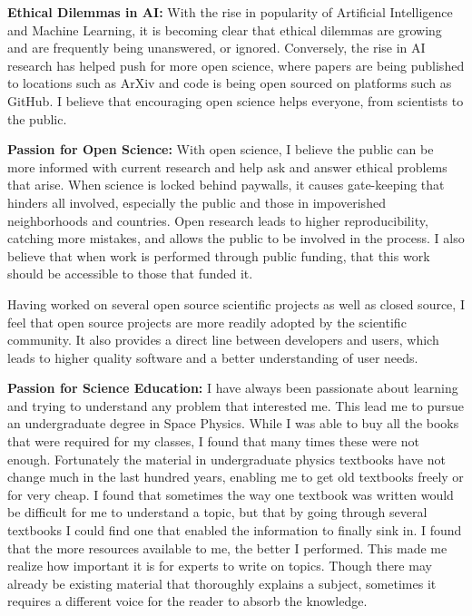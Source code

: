 \documentclass[12pt]{article}
\begin{document}
\textbf{Ethical Dilemmas in AI: }With the rise in popularity of Artificial
Intelligence and Machine Learning, it is becoming clear that ethical dilemmas
are growing and are frequently being unanswered, or ignored. Conversely, the
rise in AI research has helped push for more open science, where papers are
being published to locations such as ArXiv and code is being open sourced on
platforms such as GitHub. I believe that encouraging open science helps
everyone, from scientists to the public. 


\textbf{Passion for Open Science: }With open science, I believe the public can
be more informed with current research and help ask and answer ethical problems
that arise. When science is locked behind paywalls, it causes gate-keeping that
hinders all involved, especially the public and those in impoverished
neighborhoods and countries. Open research leads to higher reproducibility,
catching more mistakes, and allows the public to be involved in the process. I
also believe that when work is performed through public funding, that this work
should be accessible to those that funded it.

Having worked on several open source scientific projects as well as closed
source, I feel that open source projects are more readily adopted
by the scientific community. It also provides a direct line between developers and
users, which leads to higher quality software and a better understanding of
user needs. 

\textbf{Passion for Science Education: }I have always been passionate about
learning and trying to understand any problem that interested me. This lead me
to pursue an undergraduate degree in Space Physics. While I was able to buy all
the books that were required for my classes, I found that many times these were
not enough. Fortunately the material in undergraduate physics textbooks have not
change much in the last hundred years, enabling me to get old textbooks freely
or for very cheap. I found that sometimes the way one textbook was written would
be difficult for me to understand a topic, but that by going through several
textbooks I could find one that enabled the information to finally sink in. I
found that the more resources available to me, the better I performed. This made
me realize how important it is for experts to write on topics. Though there may
already be existing material that thoroughly explains a subject, sometimes it
requires a different voice for the reader to absorb the knowledge.
\end{document}

